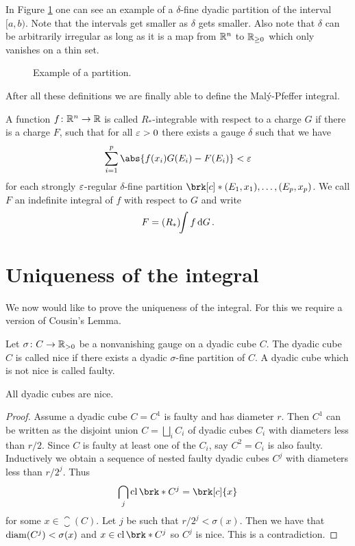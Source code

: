 In Figure \ref{fi:Partition} one can see an example of a $\delta$-fine dyadic partition of the interval $[a,b)$. Note that the intervals get smaller as $\delta$ gets smaller. Also note that $\delta$ can be arbitrarily irregular as long as it is a map from $\mathbb{R}^n$ to $\mathbb{R}_{\geq0}$ which only vanishes on a thin set.


\begin{figure}
\centering

\caption{Example of a partition.}
\label{fi:Partition}
\end{figure}

After all these definitions we are finally able to define the Malý-Pfeffer integral.

\begin{definition}[$R_*$-integral]
A function $f\colon \mathbb{R}^n\to\mathbb{R}$ is called $R_*$-integrable with respect to a charge $G$ if there is a charge $F$, such that for all $\varepsilon>0$ there exists a gauge $\delta$ such that we have
\begin{align*}
	\sum_{i=1}^p\abs{f(x_i)G(E_i)-F(E_i)}<\e
\end{align*}
for each strongly $\varepsilon$-regular $\delta$-fine partition $\brk[c]*{(E_1,x_1),\dots,(E_p,x_p)}$. We call $F$ an indefinite integral of $f$ with respect to $G$ and write
\begin{align*}
	F=(R_*)\!\!\int f\,\mathrm{d} G\,.
\end{align*}
\end{definition}


\section*{Uniqueness of the integral}

We now would like to prove the uniqueness of the integral. For this we require a version of Cousin's Lemma.

\begin{definition}
Let $\sigma\colon C\to\mathbb{R}_{>0}$ be a nonvanishing gauge on a dyadic cube $C$. The dyadic cube $C$ is called nice if there exists a dyadic $\sigma$-fine partition of $C$.
A dyadic cube which is not nice is called faulty.
\end{definition}

\begin{lemma}[Cousin]\label{le:Cousin}
All dyadic cubes are nice.
\end{lemma}
\begin{proof}
Assume a dyadic cube $C=C^1$ is faulty and has diameter $r$. Then $C^1$ can be written as the disjoint union $C=\bigsqcup_iC_i$ of dyadic cubes $C_i$ with diameters less than $r/2$. Since $C$ is faulty at least one of the $C_i$, say $C^2=C_i$ is also faulty. Inductively we obtain a sequence of nested faulty dyadic cubes $C^j$ with diameters less than $r/2^j$. Thus
\begin{align*}
	\bigcap_j\closure\brk*{C^j}=\brk[c]{x}
\end{align*}
for some $x\in \closure(C)$. Let $j$ be such that $r/2^j<\sigma(x)$. Then we have that $\operatorname{diam}(C^j)<\sigma(x)$ and $x\in \closure\brk*{C^j}$ so $C^j$ is nice. This is a contradiction.
\end{proof}

